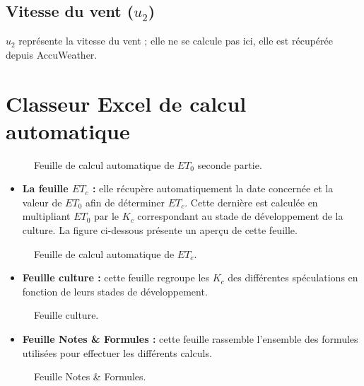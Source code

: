 \subsection{Vitesse du vent (\texorpdfstring{$u_2$}{u2})}

$u_2$ représente la vitesse du vent ; elle ne se calcule pas ici, elle est récupérée depuis AccuWeather.

\section{Classeur Excel de calcul automatique}


\begin{figure}[H]
    \centering
    \caption{Feuille de calcul automatique de $ET_0$ seconde partie. }
    \label{fig:partie2}
\end{figure}

\begin{itemize}[label=$\bullet$]
    \item \textbf{La feuille $ET_c$ :} elle récupère automatiquement la date concernée et la valeur de $ET_0$ afin de déterminer $ET_c$. Cette dernière est calculée en multipliant $ET_0$ par le $K_c$ correspondant au stade de développement de la culture. La figure ci-dessous présente un aperçu de cette feuille.
\end{itemize}

\begin{figure}[H]
    \centering
    \caption{Feuille de calcul automatique de $ET_c$. }
    \label{fig:ETC3}
\end{figure}

\begin{itemize}[label=$\bullet$]
    \item \textbf{Feuille culture :} cette feuille regroupe les $K_c$ des différentes spéculations en fonction de leurs stades de développement.
\end{itemize}

\begin{figure}[H]
    \centering
    \caption{Feuille culture. }
    \label{fig:culture3}
\end{figure}

\begin{itemize}[label=$\bullet$]
    \item \textbf{Feuille Notes \& Formules :} cette feuille rassemble l'ensemble des formules utilisées pour effectuer les différents calculs.
\end{itemize}

\begin{figure}[H]
    \centering
    \caption{Feuille Notes \& Formules. }
    \label{fig:formule3}
\end{figure}
